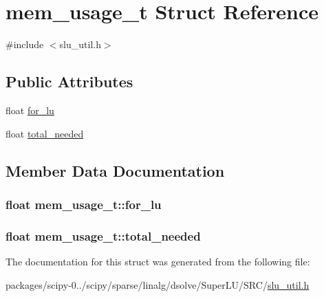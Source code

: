 \hypertarget{structmem__usage__t}{}\section{mem\+\_\+usage\+\_\+t Struct Reference}
\label{structmem__usage__t}


{\ttfamily \#include $<$slu\+\_\+util.\+h$>$}

\subsection*{Public Attributes}
\begin{DoxyCompactItemize}
\item 
float \hyperlink{structmem__usage__t_aea63300065ca81e5387c1706d7b3e705}{for\+\_\+lu}
\item 
float \hyperlink{structmem__usage__t_a7225324e3925e071e95a58d49367a88a}{total\+\_\+needed}
\end{DoxyCompactItemize}


\subsection{Member Data Documentation}
\hypertarget{structmem__usage__t_aea63300065ca81e5387c1706d7b3e705}{}
\subsubsection[{for\+\_\+lu}]{\setlength{\rightskip}{0pt plus 5cm}float mem\+\_\+usage\+\_\+t\+::for\+\_\+lu}\label{structmem__usage__t_aea63300065ca81e5387c1706d7b3e705}
\hypertarget{structmem__usage__t_a7225324e3925e071e95a58d49367a88a}{}
\subsubsection[{total\+\_\+needed}]{\setlength{\rightskip}{0pt plus 5cm}float mem\+\_\+usage\+\_\+t\+::total\+\_\+needed}\label{structmem__usage__t_a7225324e3925e071e95a58d49367a88a}


The documentation for this struct was generated from the following file\+:\begin{DoxyCompactItemize}
\item 
packages/scipy-\/0../scipy/sparse/linalg/dsolve/\+Super\+L\+U/\+S\+R\+C/\hyperlink{slu__util_8h}{slu\+\_\+util.\+h}\end{DoxyCompactItemize}
